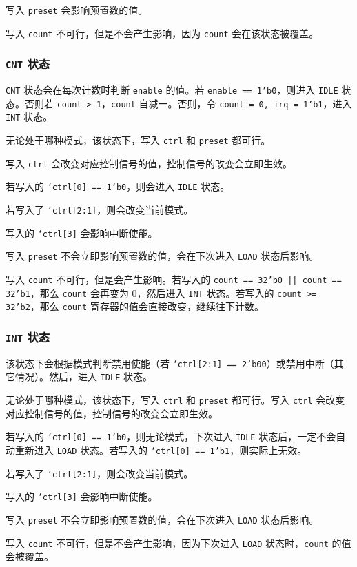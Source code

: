 \documentclass[12pt,AutoFakeBold,AutoFakeSlant]{article}
\newcommand{\ms}[1]{\texttt{#1}}
\begin{document}
写入 \ms{preset} 会影响预置数的值。

写入 \ms{count} 不可行，但是不会产生影响，因为 \ms{count} 会在该状态被覆盖。

\subsubsection{\ms{CNT} 状态}

\ms{CNT} 状态会在每次计数时判断 \ms{enable} 的值。若 \ms{enable == 1'b0}，则进入 \ms{IDLE} 状态。否则若 \ms{count > 1}，\ms{count} 自减一。否则，令 \ms{count = 0, irq = 1'b1}，进入 \ms{INT} 状态。

无论处于哪种模式，该状态下，写入 \ms{ctrl} 和 \ms{preset} 都可行。

写入 \ms{ctrl} 会改变对应控制信号的值，控制信号的改变会立即生效。

若写入的 \ms{`ctrl[0] == 1'b0}，则会进入 \ms{IDLE} 状态。

若写入了 \ms{`ctrl[2:1]}，则会改变当前模式。

写入的 \ms{`ctrl[3]} 会影响中断使能。

写入 \ms{preset} 不会立即影响预置数的值，会在下次进入 \ms{LOAD} 状态后影响。

写入 \ms{count} 不可行，但是会产生影响。若写入的 \ms{count == 32'b0 || count == 32'b1}，那么 \ms{count} 会再变为 0，然后进入 \ms{INT} 状态。若写入的 \ms{count >= 32'b2}，那么 \ms{count} 寄存器的值会直接改变，继续往下计数。

\subsubsection{\ms{INT} 状态}

该状态下会根据模式判断禁用使能（若 \ms{`ctrl[2:1] == 2'b00}）或禁用中断（其它情况）。然后，进入 \ms{IDLE} 状态。

无论处于哪种模式，该状态下，写入 \ms{ctrl} 和 \ms{preset} 都可行。写入 \ms{ctrl} 会改变对应控制信号的值，控制信号的改变会立即生效。

若写入的 \ms{`ctrl[0] == 1'b0}，则无论模式，下次进入 \ms{IDLE} 状态后，一定不会自动重新进入 \ms{LOAD} 状态。若写入的 \ms{`ctrl[0] == 1'b1}，则实际上无效。

若写入了 \ms{`ctrl[2:1]}，则会改变当前模式。

写入的 \ms{`ctrl[3]} 会影响中断使能。

写入 \ms{preset} 不会立即影响预置数的值，会在下次进入 \ms{LOAD} 状态后影响。

写入 \ms{count} 不可行，但是不会产生影响，因为下次进入 \ms{LOAD} 状态时，\ms{count} 的值会被覆盖。
\end{document}
